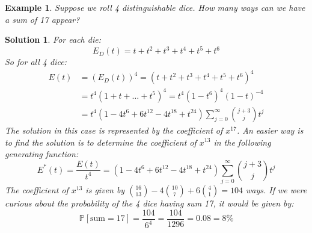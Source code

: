 \documentclass[12pt, letterpaper, onecolumn, conference, final]{IEEEtran}
\theoremstyle{definition}
\theoremstyle{plain}
\newtheorem{example}{Example}[section]
\newtheorem{solution}{Solution}[section]
\begin{document}
\newpage
\begin{example}
Suppose we roll 4 distinguishable dice. How many ways can we have a sum of 17 appear?
\end{example}
\begin{solution}
For each die:
\begin{equation*}
E_D(t) = t + t^2 + t^3 + t^4 + t^5 + t^6
\end{equation*}
So for all 4 dice:
\begin{equation*}
\begin{split}
E(t) &= (E_D(t))^4 = (t + t^2 + t^3 + t^4 + t^5 + t^6)^4 \\
&= t^4 (1 + t + \dots + t^5)^4 = t^4 (1-t^6)^4 (1-t)^{-4} \\
&= t^4 (1 - 4t^6 + 6t^{12} - 4t^{18} + t^{24}) \sum_{j=0}^\infty {j+3 \choose j} t^j
\end{split}
\end{equation*}
The solution in this case is represented by the coefficient of $x^{17}$. An easier way is to find the solution is to determine the coefficient of $x^{13}$ in the following generating function:
\begin{equation*}
E^*(t) = \frac{E(t)}{t^4} = (1 - 4t^6 + 6t^{12} - 4t^{18} + t^{24}) \sum_{j=0}^\infty {j+3 \choose j} t^j
\end{equation*}
The coefficient of $x^{13}$ is given by ${16 \choose 13} - 4{10 \choose 7} + 6{4 \choose 1} = 104$ ways. If we were curious about the probability of the 4 dice having sum 17, it would be given by:
\begin{equation*}
\mathbb{P}[\text{sum} = 17] = \frac{104}{6^4} = \frac{104}{1296} = 0.08 = 8\%
\end{equation*}
\end{solution}
\end{document}
